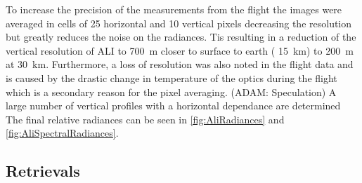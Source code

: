 \documentclass[12pt]{article}
\begin{document}

To increase the precision of the measurements from the flight the images were averaged in cells of 25 horizontal and 10 vertical pixels decreasing the resolution but greatly reduces the noise on the radiances. Tis resulting in a reduction of the vertical resolution of ALI to 700~m closer to surface to earth ( 15~km) to 200~m at 30~km. Furthermore, a loss of resolution was also noted in the flight data and is caused by the drastic change in temperature of the optics during the flight which is a secondary reason for the pixel averaging. (ADAM: Speculation) A large number of vertical profiles with a horizontal dependance are determined The final relative radiances can be seen in \autoref{fig:AliRadiances} and \autoref{fig:AliSpectralRadiances}.

\subsection{Retrievals}
\label{sec:retrievals}
\end{document}
